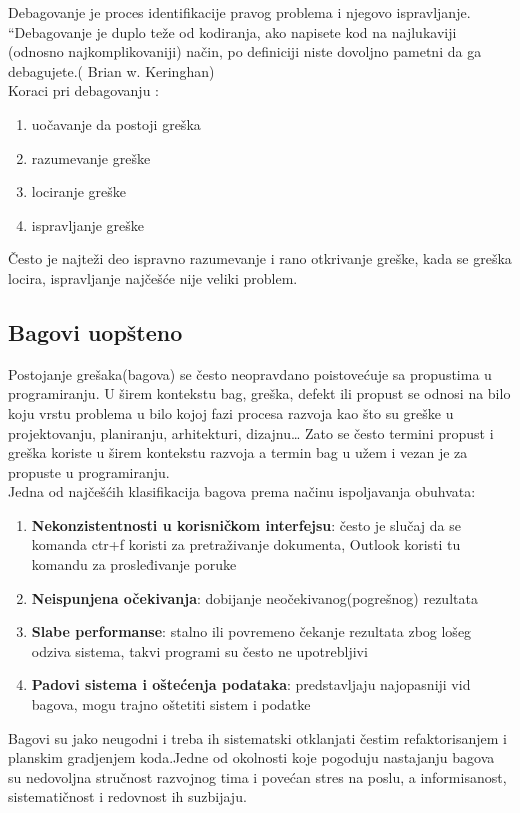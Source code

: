 \documentclass[a4paper]{article}
\begin{document}
Debagovanje je proces identifikacije pravog problema i njegovo ispravljanje.
“Debagovanje je duplo teže od kodiranja, ako napisete kod na najlukaviji (odnosno najkomplikovaniji) način, po definiciji niste dovoljno pametni da ga debagujete.( Brian w. Keringhan) \cite{debagovanje_vladaf}\\
Koraci pri debagovanju \cite{bagovi_smalkov}:
\begin{enumerate}
\item uočavanje da postoji greška
\item razumevanje greške
\item lociranje greške
\item ispravljanje greške
\end{enumerate}
Često je najteži deo ispravno razumevanje i rano otkrivanje greške, kada se greška locira, ispravljanje najčešće nije veliki problem.



\subsection{Bagovi uopšteno}
\label{subsec:podnaslov1}

Postojanje grešaka(bagova) se često neopravdano poistovećuje sa propustima u programiranju.
U širem kontekstu bag, greška, defekt ili propust se odnosi na bilo koju vrstu problema u bilo kojoj fazi procesa razvoja kao što su greške u projektovanju, planiranju, arhitekturi, dizajnu…
Zato se često termini propust i greška koriste u širem kontekstu razvoja a termin bag u užem i vezan je za propuste u programiranju.\\
\indent Jedna od najčešćih klasifikacija bagova prema načinu ispoljavanja obuhvata:
\begin{enumerate}
	\item \textbf{Nekonzistentnosti u korisničkom interfejsu}: često je slučaj da se komanda ctr+f koristi za pretraživanje dokumenta, Outlook koristi   
	tu komandu za prosleđivanje poruke
	\item \textbf{Neispunjena očekivanja}: dobijanje neočekivanog(pogrešnog) rezultata
	\item \textbf{Slabe performanse}: stalno ili povremeno čekanje rezultata zbog lošeg odziva sistema, takvi programi su često ne upotrebljivi
	\item \textbf{Padovi sistema i oštećenja podataka}: predstavljaju najopasniji vid bagova, mogu trajno oštetiti sistem i podatke
\end{enumerate}
\indent Bagovi su jako neugodni i treba ih sistematski otklanjati čestim refaktorisanjem i planskim gradjenjem koda.Jedne od okolnosti koje pogoduju nastajanju bagova su nedovoljna stručnost razvojnog tima i povećan stres na poslu, a informisanost, sistematičnost i redovnost ih suzbijaju. \cite{debagovanje_vladaf}
\end{document}
